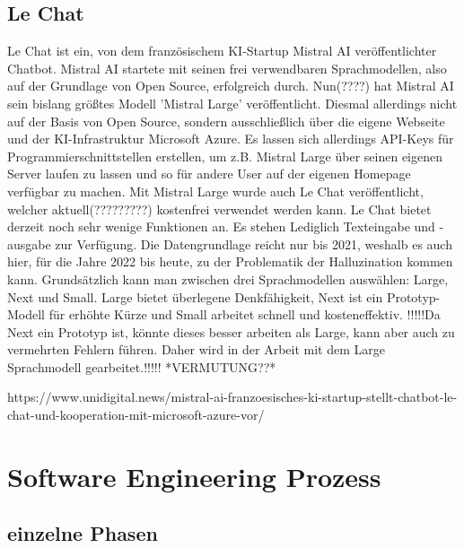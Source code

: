 \subsection{Le Chat}  \label{Le Chat}

Le Chat ist ein, von dem französischem KI-Startup Mistral AI veröffentlichter Chatbot. Mistral AI startete mit  
seinen frei verwendbaren Sprachmodellen, also auf der Grundlage von Open Source, erfolgreich durch. Nun(????)  
hat Mistral AI sein bislang größtes Modell 'Mistral Large' veröffentlicht. Diesmal allerdings nicht auf der  
Basis von Open Source, sondern ausschließlich über die eigene Webseite und der KI-Infrastruktur Microsoft  
Azure. Es lassen sich allerdings API-Keys für Programmierschnittstellen erstellen, um z.B. Mistral Large über  
seinen eigenen Server laufen zu lassen und so für andere User auf der eigenen Homepage verfügbar zu machen.  
Mit Mistral Large wurde auch Le Chat veröffentlicht, welcher aktuell(?????????) kostenfrei verwendet werden kann.
Le Chat bietet derzeit noch sehr wenige Funktionen an. Es stehen Lediglich Texteingabe und -ausgabe zur Verfügung.  
Die Datengrundlage reicht nur bis 2021, weshalb es auch hier, für die Jahre 2022 bis heute, zu der Problematik der  
Halluzination kommen kann.
Grundsätzlich kann man zwischen drei Sprachmodellen auswählen: Large, Next und Small. Large bietet überlegene Denkfähigkeit,  
Next ist ein Prototyp-Modell für erhöhte Kürze und Small arbeitet schnell und kosteneffektiv. !!!!!Da Next ein Prototyp ist, könnte  
dieses besser arbeiten als Large, kann aber auch zu vermehrten Fehlern führen. Daher wird in der Arbeit mit dem Large  
Sprachmodell gearbeitet.!!!!! *VERMUTUNG??*


https://www.unidigital.news/mistral-ai-franzoesisches-ki-startup-stellt-chatbot-le-chat-und-kooperation-mit-microsoft-azure-vor/

\section{Software Engineering Prozess}

\subsection{einzelne Phasen}  \label{einzelne Phasen}
